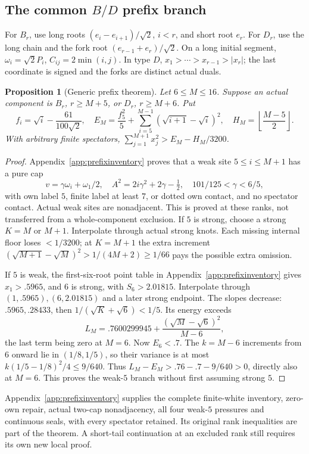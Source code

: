 \documentclass[11pt]{article}
\newtheorem{proposition}[theorem]{Proposition}
\theoremstyle{definition}
\theoremstyle{remark}
\begin{document}
\subsection[The common B/D prefix branch]{The common \(B/D\) prefix branch}
For \(B_r\), use long roots \((e_i-e_{i+1})/\sqrt2\), \(i<r\),
and short root \(e_r\). For \(D_r\), use the long chain and the
fork root \((e_{r-1}+e_r)/\sqrt2\). On a long initial segment,
\(\omega_i=\sqrt2P_i\), \(C_{ij}=2\min(i,j)\).
In type \(D\), \(x_1>\cdots>x_{r-1}>|x_r|\); the last
coordinate is signed and the forks are distinct actual duals.
\begin{proposition}[Generic prefix theorem]
\label{prop:prefix}
Let \(6\leq M\leq16\). Suppose an actual component is \(B_r\),
\(r\geq M+5\), or \(D_r\), \(r\geq M+6\). Put
\[
 f_i=\sqrt i-\frac{61}{100\sqrt2},\quad
 E_M=\frac{f_5^2}{5}+\sum_{i=5}^{M-1}(\sqrt{i+1}-\sqrt i)^2,
 \quad H_M=\left\lfloor\frac{M-5}{2}\right\rfloor.
\]
With arbitrary finite spectators,
\(\sum_{j=1}^{M+1}x_j^2>E_M-H_M/3200\).
\end{proposition}
\begin{proof}
Appendix~\ref{app:prefixinventory} proves that a weak site
\(5\leq i\leq M+1\) has a pure cap
\[
 v=\gamma\omega_i+\omega_1/2,\quad
 A^2=2i\gamma^2+2\gamma-\tfrac12,\quad
 101/125<\gamma<6/5,
\]
with own label \(5\), finite label at least \(7\), or dotted own
contact, and no spectator contact. Actual weak sites are
nonadjacent. This is proved at these ranks, not transferred from
a whole-component exclusion.
If \(5\) is strong, choose a strong \(K=M\) or \(M+1\).
Interpolate through actual strong knots. Each missing internal
floor loses \(<1/3200\); at \(K=M+1\) the extra increment
\((\sqrt{M+1}-\sqrt M)^2>1/(4M+2)\geq1/66\)
pays the possible extra omission.

If \(5\) is weak, the first-six-root point table in
Appendix~\ref{app:prefixinventory} gives \(x_1>.5965\), and \(6\) is strong, with
\(S_6>2.01815\). Interpolate through \((1,.5965),(6,2.01815)\)
and a later strong endpoint. The slopes decrease:
\(.5965,.28433\), then \(1/(\sqrt K+\sqrt6)<1/5\).
Its energy exceeds
\[
 L_M=.7600299945+\frac{(\sqrt M-\sqrt6)^2}{M-6},
\]
the last term being zero at \(M=6\).
Now \(E_6<.7\). The \(k=M-6\) increments from \(6\) onward lie
in \((1/8,1/5)\), so their variance is at most
\(k(1/5-1/8)^2/4\leq9/640\).
Thus \(L_M-E_M>.76-.7-9/640>0\), directly also at \(M=6\).
This proves the weak-\(5\) branch without first assuming strong \(5\).
\end{proof}
Appendix~\ref{app:prefixinventory} supplies the complete
finite-white inventory, zero-own repair, actual two-cap
nonadjacency, all four weak-\(5\) pressures and continuous
seals, with every spectator retained. Its original rank
inequalities are part of the theorem. A short-tail continuation
at an excluded rank still requires its own new local proof.
\end{document}
